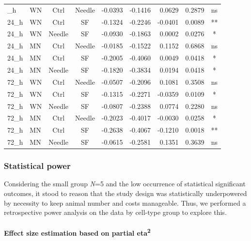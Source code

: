 \documentclass[
  12pt,
  letterpaper,
]{article}
\begin{document}
\begin{longtable}{llccrrrrc}
\midrule\addlinespace[2.5pt]
\multicolumn{9}{l}{Predictor: Route} \\ 
\midrule\addlinespace[2.5pt]
24\_h & WN & Ctrl & Needle & -0.0393 & -0.1416 & 0.0629 & 0.2879 & ns \\ 
24\_h & WN & Ctrl & SF & -0.1324 & -0.2246 & -0.0401 & 0.0089 & ** \\ 
24\_h & WN & Needle & SF & -0.0930 & -0.1863 & 0.0002 & 0.0276 & * \\ 
24\_h & MN & Ctrl & Needle & -0.0185 & -0.1522 & 0.1152 & 0.6868 & ns \\ 
24\_h & MN & Ctrl & SF & -0.2005 & -0.4060 & 0.0049 & 0.0418 & * \\ 
24\_h & MN & Needle & SF & -0.1820 & -0.3834 & 0.0194 & 0.0418 & * \\ 
72\_h & WN & Ctrl & Needle & -0.0507 & -0.2096 & 0.1081 & 0.3508 & ns \\ 
72\_h & WN & Ctrl & SF & -0.1315 & -0.2271 & -0.0359 & 0.0109 & * \\ 
72\_h & WN & Needle & SF & -0.0807 & -0.2388 & 0.0774 & 0.2280 & ns \\ 
72\_h & MN & Ctrl & Needle & -0.2023 & -0.4017 & -0.0030 & 0.0258 & * \\ 
72\_h & MN & Ctrl & SF & -0.2638 & -0.4067 & -0.1210 & 0.0018 & ** \\ 
72\_h & MN & Needle & SF & -0.0615 & -0.2581 & 0.1351 & 0.3639 & ns \\ 
\bottomrule
\end{longtable}

\subsubsection{Statistical power}\label{statistical-power}

Considering the small group \emph{N}=5 and the low occurrence of statistical significant outcomes, it stood to reason that the study design was statistically underpowered by necessity to keep animal number and costs manageable. Thus, we performed a retrospective power analysis on the data by cell-type group to explore this.

\paragraph{\texorpdfstring{Effect size estimation based on partial eta\textsuperscript{2}}{Effect size estimation based on partial eta2}}\label{effect-size-estimation-based-on-partial-eta2}
\end{document}
